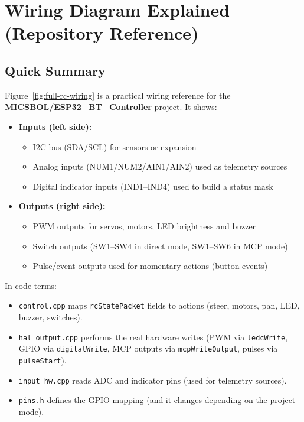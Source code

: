 \chapter{Wiring Diagram Explained (Repository Reference)}
\label{ch:wiring-diagram-explained}

\section{Quick Summary}
\label{sec:wiring-quick-summary}

Figure~\ref{fig:full-rc-wiring} is a practical wiring reference for the \textbf{MICSBOL/ESP32\_BT\_Controller}
project. It shows:

\begin{itemize}
    \item \textbf{Inputs (left side):}
    \begin{itemize}
        \item I2C bus (SDA/SCL) for sensors or expansion
        \item Analog inputs (NUM1/NUM2/AIN1/AIN2) used as telemetry sources
        \item Digital indicator inputs (IND1--IND4) used to build a status mask
    \end{itemize}
    \item \textbf{Outputs (right side):}
    \begin{itemize}
        \item PWM outputs for servos, motors, LED brightness and buzzer
        \item Switch outputs (SW1--SW4 in direct mode, SW1--SW6 in MCP mode)
        \item Pulse/event outputs used for momentary actions (button events)
    \end{itemize}
\end{itemize}

\noindent In code terms:
\begin{itemize}
    \item \texttt{control.cpp} maps \texttt{rcStatePacket} fields to actions (steer, motors, pan, LED, buzzer, switches).
    \item \texttt{hal\_output.cpp} performs the real hardware writes (PWM via \texttt{ledcWrite}, GPIO via \texttt{digitalWrite},
    MCP outputs via \texttt{mcpWriteOutput}, pulses via \texttt{pulseStart}).
    \item \texttt{input\_hw.cpp} reads ADC and indicator pins (used for telemetry sources).
    \item \texttt{pins.h} defines the GPIO mapping (and it changes depending on the project mode).
\end{itemize}

